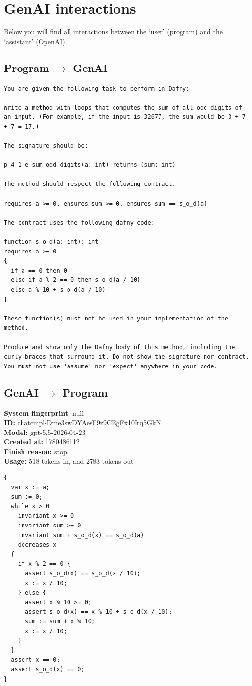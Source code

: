 \documentclass{article}
\begin{document}
\section*{GenAI interactions}
Below you will find all interactions between the `user' (program) and the `assistant' (OpenAI).
\subsection*{Program $\rightarrow$ GenAI}
\begin{lstlisting}
You are given the following task to perform in Dafny:

Write a method with loops that computes the sum of all odd digits of an input. (For example, if the input is 32677, the sum would be 3 + 7 + 7 = 17.)

The signature should be:

p_4_1_e_sum_odd_digits(a: int) returns (sum: int)

The method should respect the following contract:

requires a >= 0, ensures sum >= 0, ensures sum == s_o_d(a)

The contract uses the following dafny code:

function s_o_d(a: int): int
requires a >= 0
{
  if a == 0 then 0
  else if a % 2 == 0 then s_o_d(a / 10)
  else a % 10 + s_o_d(a / 10)
}

These function(s) must not be used in your implementation of the method.

Produce and show only the Dafny body of this method, including the curly braces that surround it. Do not show the signature nor contract. You must not use 'assume' nor 'expect' anywhere in your code.
\end{lstlisting}
\subsection*{GenAI $\rightarrow$ Program}
\textbf{System fingerprint: }null
\\\textbf{ID: }chatcmpl-Dme3swDYAesF9z9CEgFx10Irq5GkN
\\\textbf{Model: }gpt-5.5-2026-04-23
\\\textbf{Created at: }1780486112
\\\textbf{Finish reason: }stop
\\\textbf{Usage: }518 tokens in, and 2783 tokens out
\begin{lstlisting}
{
  var x := a;
  sum := 0;
  while x > 0
    invariant x >= 0
    invariant sum >= 0
    invariant sum + s_o_d(x) == s_o_d(a)
    decreases x
  {
    if x % 2 == 0 {
      assert s_o_d(x) == s_o_d(x / 10);
      x := x / 10;
    } else {
      assert x % 10 >= 0;
      assert s_o_d(x) == x % 10 + s_o_d(x / 10);
      sum := sum + x % 10;
      x := x / 10;
    }
  }
  assert x == 0;
  assert s_o_d(x) == 0;
}
\end{lstlisting}
\end{document}

